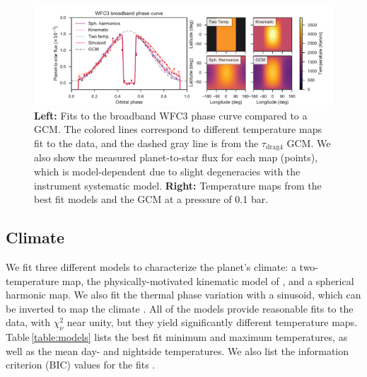 \documentclass[twocolumn, trackchanges]{aastex61}
\begin{document}
\begin{figure}
\includegraphics[width = 1.0\textwidth, trim={1.5cm 0 0.5cm 0},clip]{fig8.pdf}
\caption{\textbf{Left:} Fits to the broadband WFC3 phase curve compared to a GCM. The colored lines correspond to different temperature maps fit to the data, and the dashed gray line is from the $\tau_\mathrm{drag4}$ GCM. We also show the measured planet-to-star flux for each map (points), which is model-dependent due to slight degeneracies with the instrument systematic model.  \textbf{Right:} Temperature maps from the best fit models and the GCM at a pressure of 0.1 bar.}
\label{fig:model_comparison}
\end{figure}


\subsection{Climate}
We fit three different models to characterize the planet's climate: a two-temperature map, the physically-motivated kinematic model of \cite{zhang17}, and a spherical harmonic map. We also fit the thermal phase variation with a sinusoid, which can be inverted to map the climate \citep{cowan08, cowan17}.  All of the models provide reasonable fits to the data, with $\chi^2_\nu$ near unity, but they yield significantly different temperature maps. Table\,\ref{table:models} lists the best fit minimum and maximum temperatures, as well as the mean day- and nightside temperatures. We also list the  information criterion (BIC) values for the fits \citep[a $\Delta$BIC value greater than 10 constitutes strong evidence against a given model;][]{kass95}.

\end{document}
